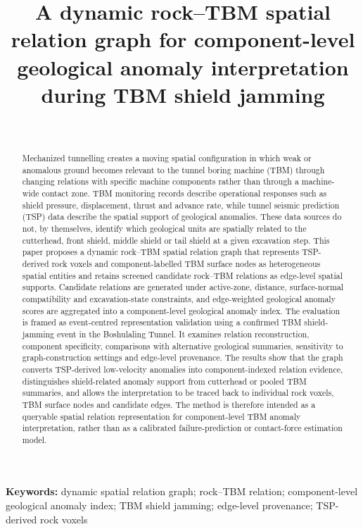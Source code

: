 \documentclass{tGIS2e}
\title{A dynamic rock--TBM spatial relation graph for component-level geological anomaly interpretation during TBM shield jamming}
\author{
\name{First Author\textsuperscript{a}\thanks{Email: first.author@example.com} and
Second Author\textsuperscript{b}} \\
\affil{\textsuperscript{a}Department of XXX, University A, City, Country; \\
\textsuperscript{b}Institute of YYY, University B, City, Country}
}
\newenvironment{keywords}{\par\noindent\textbf{Keywords: }}{\par}
\begin{document}
\maketitle

\begin{abstract}
Mechanized tunnelling creates a moving spatial configuration in which weak or anomalous ground becomes relevant to the tunnel boring machine (TBM) through changing relations with specific machine components rather than through a machine-wide contact zone. TBM monitoring records describe operational responses such as shield pressure, displacement, thrust and advance rate, while tunnel seismic prediction (TSP) data describe the spatial support of geological anomalies. These data sources do not, by themselves, identify which geological units are spatially related to the cutterhead, front shield, middle shield or tail shield at a given excavation step. This paper proposes a dynamic rock--TBM spatial relation graph that represents TSP-derived rock voxels and component-labelled TBM surface nodes as heterogeneous spatial entities and retains screened candidate rock--TBM relations as edge-level spatial supports. Candidate relations are generated under active-zone, distance, surface-normal compatibility and excavation-state constraints, and edge-weighted geological anomaly scores are aggregated into a component-level geological anomaly index. The evaluation is framed as event-centred representation validation using a confirmed TBM shield-jamming event in the Boshulaling Tunnel. It examines relation reconstruction, component specificity, comparisons with alternative geological summaries, sensitivity to graph-construction settings and edge-level provenance. The results show that the graph converts TSP-derived low-velocity anomalies into component-indexed relation evidence, distinguishes shield-related anomaly support from cutterhead or pooled TBM summaries, and allows the interpretation to be traced back to individual rock voxels, TBM surface nodes and candidate edges. The method is therefore intended as a queryable spatial relation representation for component-level TBM anomaly interpretation, rather than as a calibrated failure-prediction or contact-force estimation model.
\end{abstract}

\begin{keywords}
dynamic spatial relation graph; rock--TBM relation; component-level geological anomaly index; TBM shield jamming; edge-level provenance; TSP-derived rock voxels
\end{keywords}
\end{document}
